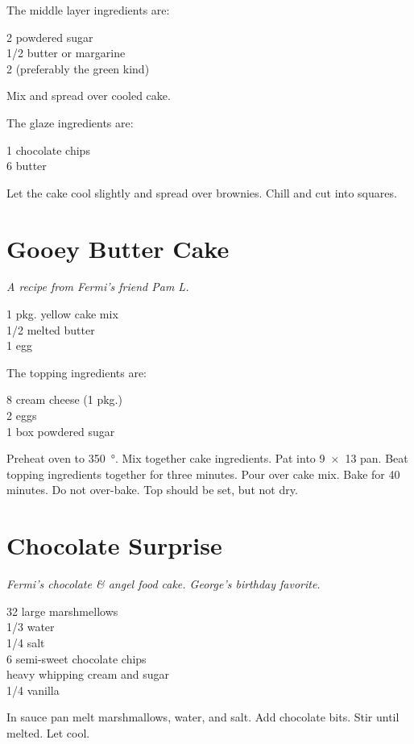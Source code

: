 The middle layer ingredients are:
\begin{ingredients}
  \SI{2}{\cup} powdered sugar\\
  \SI{1/2}{\cup} butter or margarine\\
  \SI{2}{\tblspoon}  (preferably the green kind)
\end{ingredients}
Mix and spread over cooled cake.

The glaze ingredients are:
\begin{ingredients}
  \SI{1}{\cup} chocolate chips\\
  \SI{6}{\tblspoon} butter
\end{ingredients}
Let the cake cool slightly and spread over brownies.  Chill and cut into
squares.

\section{Gooey Butter Cake}

\textit{A recipe from Fermi's friend Pam L.}
\begin{ingredients}
  1 pkg. yellow cake mix\\
  \SI{1/2}{\cup} melted butter\\
  1 egg
\end{ingredients}
The topping ingredients are:
\begin{ingredients}
  \SI{8}{\ounce} cream cheese (1 pkg.)\\
  2 eggs\\
  1 box powdered sugar
\end{ingredients}
Preheat oven to \SI{350}{\degree}.  Mix together cake ingredients.  Pat into
\SI{9x13}{\inch} pan.  Beat topping ingredients together for three minutes.
Pour over cake mix.  Bake for 40 minutes.  Do not over-bake. Top should be
set, but not dry.

\section{Chocolate Surprise}

\textit{Fermi's chocolate \& angel food cake.  George's birthday favorite.}
\begin{ingredients}
  32 large marshmellows\\
  \SI{1/3}{\cup} water\\
  \SI{1/4}{\teaspoon} salt\\
  \SI{6}{\ounce} semi-sweet chocolate chips\\
  heavy whipping cream and sugar\\
  \SI{1/4}{\teaspoon} vanilla
\end{ingredients}
In sauce pan melt marshmallows, water, and salt.  Add chocolate bits.  Stir
until melted.  Let cool.

